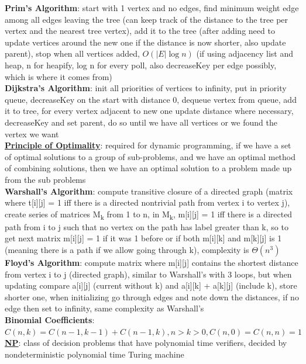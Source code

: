 \documentclass[a4paper]{article}
\begin{document}
\begin{multicols}{2}
        \textbf{Prim's Algorithm}: start with 1 vertex and no edges, find minimum weight edge among all edges leaving the tree (can keep track of the distance to the tree per vertex and the nearest tree vertex), add it to the tree (after adding need to update vertices around the new one if the distance is now shorter, also update parent), stop when all vertices added, $O(|E| \log n)$ (if using adjacency list and heap, n for heapify, log n for every poll, also decreaseKey per edge possibly, which is where it comes from)\\
        \textbf{Dijkstra's Algorithm}: init all priorities of vertices to infinity, put in priority queue, decreaseKey on the start with distance 0, dequeue vertex from queue, add it to tree, for every vertex adjacent to new one update distance where necessary, decreaseKey and set parent, do so until we have all vertices or we found the vertex we want\\
        \underline{\textbf{Principle of Optimality}}: required for dynamic programming, if we have a set of optimal solutions to a group of sub-problems, and we have an optimal method of combining solutions, then we have an optimal solution to a problem made up from the sub problems\\
        \textbf{Warshall's Algorithm}: compute transitive closure of a directed graph (matrix where t[i][j] = 1 iff there is a directed nontrivial path from vertex i to vertex j), create series of matrices M\textsubscript{k} from 1 to n, in M\textsubscript{k}, m[i][j] = 1 iff there is a directed path from i to j such that no vertex on the path has label greater than k, so to get next matrix m[i][j] = 1 if it was 1 before or if both m[i][k] and m[k][j] is 1 (meaning there is a path if we allow going through k), complexity is $\Theta (n^3)$\\
        \textbf{Floyd's Algorithm}: compute matrix where m[i][j] contains the shortest distance from vertex i to j (directed graph), similar to Warshall's with 3 loops, but when updating compare a[i][j] (current without k) and a[i][k] + a[k][j] (include k), store shorter one, when initializing go through edges and note down the distances, if no edge then set to infinity, same complexity as Warshall's\\
        \textbf{Binomial Coefficients}: $C(n, k) = C(n-1, k-1) + C(n-1, k), n > k > 0, C(n,0) = C(n,n) = 1$\\
        \underline{\textbf{NP}}: class of decision problems that have polynomial time verifiers, decided by nondeterministic polynomial time Turing machine\\

\end{multicols}
\end{document}
